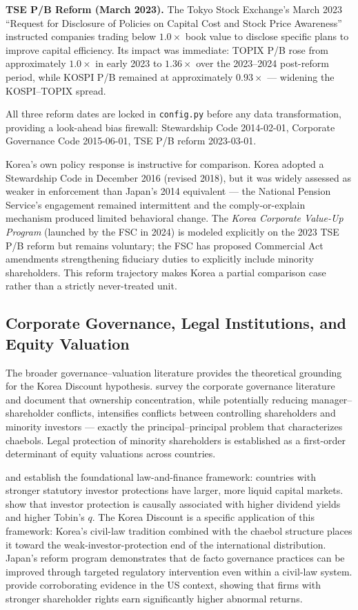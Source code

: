 \documentclass[12pt]{article}
\begin{document}
\textbf{TSE P/B Reform (March 2023).} The Tokyo Stock Exchange's March 2023 ``Request for
Disclosure of Policies on Capital Cost and Stock Price Awareness'' instructed companies
trading below $1.0\times$ book value to disclose specific plans to improve capital efficiency.
Its impact was immediate: TOPIX P/B rose from approximately $1.0\times$ in early 2023 to
$1.36\times$ over the 2023--2024 post-reform period, while KOSPI P/B remained at approximately
$0.93\times$ --- widening the KOSPI--TOPIX spread.

All three reform dates are locked in \texttt{config.py} before any data transformation,
providing a look-ahead bias firewall: Stewardship Code 2014-02-01, Corporate Governance Code
2015-06-01, TSE P/B reform 2023-03-01.

Korea's own policy response is instructive for comparison. Korea adopted a Stewardship Code
in December 2016 (revised 2018), but it was widely assessed as weaker in enforcement than
Japan's 2014 equivalent --- the National Pension Service's engagement remained intermittent
and the comply-or-explain mechanism produced limited behavioral change. The \textit{Korea
Corporate Value-Up Program} (launched by the FSC in 2024) is modeled explicitly on the 2023
TSE P/B reform but remains voluntary; the FSC has proposed Commercial Act amendments
strengthening fiduciary duties to explicitly include minority shareholders. This reform
trajectory makes Korea a partial comparison case rather than a strictly never-treated unit.

\subsection{Corporate Governance, Legal Institutions, and Equity Valuation}

The broader governance--valuation literature provides the theoretical grounding for the Korea
Discount hypothesis. \citet{shleifer1997} survey the corporate governance literature and
document that ownership concentration, while potentially reducing manager--shareholder
conflicts, intensifies conflicts between controlling shareholders and minority investors ---
exactly the principal--principal problem that characterizes chaebols. Legal protection of
minority shareholders is established as a first-order determinant of equity valuations across
countries.

\citet{porta1998} and \citet{porta2002} establish the foundational law-and-finance framework:
countries with stronger statutory investor protections have larger, more liquid capital markets.
\citet{porta2002} show that investor protection is causally associated with higher dividend
yields and higher Tobin's $q$. The Korea Discount is a specific application of this framework:
Korea's civil-law tradition combined with the chaebol structure places it toward the
weak-investor-protection end of the international distribution. Japan's reform program
demonstrates that de facto governance practices can be improved through targeted regulatory
intervention even within a civil-law system. \citet{gompers2003} provide corroborating
evidence in the US context, showing that firms with stronger shareholder rights earn
significantly higher abnormal returns.
\end{document}
